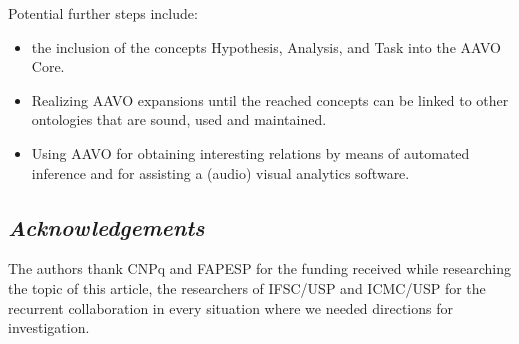 \documentclass[12pt,fleqn]{article}
\begin{document}
Potential further steps include:
\begin{itemize}
	\item the inclusion of the concepts Hypothesis, Analysis, and Task
		into the AAVO Core.
	\item Realizing AAVO expansions until the reached concepts can be linked
		to other ontologies that are sound, used and maintained.
	\item Using AAVO for obtaining interesting relations by means of automated
		inference and for assisting a (audio) visual analytics software.
\end{itemize}



\subsection*{\textit{Acknowledgements}}
The authors thank CNPq and FAPESP for the funding received while researching the topic of this article,
the researchers of IFSC/USP and ICMC/USP for the recurrent collaboration in every situation
where we needed directions for investigation.
\end{document}
